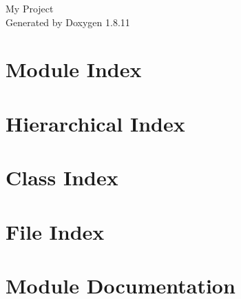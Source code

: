 \documentclass[twoside]{book}
\newcommand{\+}{\discretionary{\mbox{\scriptsize$\hookleftarrow$}}{}{}}
\newcommand{\clearemptydoublepage}{%
  \newpage{\pagestyle{empty}\cleardoublepage}%
}
\begin{document}
\hypersetup{pageanchor=false,
             bookmarksnumbered=true,
             pdfencoding=unicode
            }
\begin{titlepage}
\vspace*{7cm}
\begin{center}%
{\Large My Project }\\
\vspace*{1cm}
{\large Generated by Doxygen 1.8.11}\\
\end{center}
\end{titlepage}
\clearemptydoublepage
\tableofcontents
\clearemptydoublepage
{}
\hypersetup{pageanchor=true}

\chapter{Module Index}

\chapter{Hierarchical Index}

\chapter{Class Index}

\chapter{File Index}

\chapter{Module Documentation}








\end{document}
